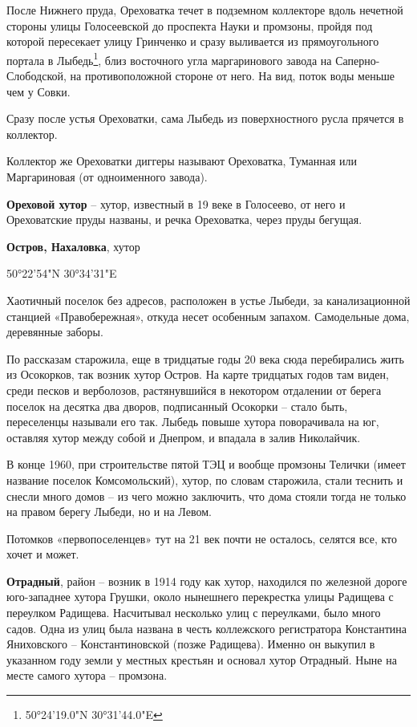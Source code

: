 После Нижнего пруда, Ореховатка течет в подземном коллекторе вдоль нечетной стороны улицы Голосеевской до проспекта Науки и промзоны, пройдя под которой пересекает улицу Гринченко и сразу выливается из прямоугольного портала в Лыбедь\footnote{50°24'19.0"N 30°31'44.0"E}, близ восточного угла маргаринового завода на Саперно-Слободской, на противоположной стороне от него. На вид, поток воды меньше чем у Совки.

Сразу после устья Ореховатки, сама Лыбедь из поверхностного русла прячется в коллектор.

Коллектор же Ореховатки диггеры называют Ореховатка, Туманная или Маргариновая (от одноименного завода).\\

\medskip

\textbf{Ореховой хутор} – хутор, известный в 19 веке в Голосеево, от него и Ореховатские пруды названы, и речка Ореховатка, через пруды бегущая.\\

\medskip

\textbf{Остров, Нахаловка}, хутор

50°22'54"N 30°34'31"E

Хаотичный поселок без адресов, расположен в устье Лыбеди, за канализационной станцией «Правобережная», откуда несет особенным запахом. Самодельные дома, деревянные заборы.

По рассказам старожила, еще в тридцатые годы 20 века сюда перебирались жить из Осокорков, так возник хутор Остров. На карте тридцатых годов там виден, среди песков и верболозов, растянувшийся в некотором отдалении от берега поселок на десятка два дворов, подписанный Осокорки – стало быть, переселенцы называли его так. Лыбедь повыше хутора поворачивала на юг, оставляя хутор между собой и Днепром, и впадала в залив Николайчик. 

В конце 1960, при строительстве пятой ТЭЦ и вообще промзоны Телички (имеет название поселок Комсомольский), хутор, по словам старожила, стали теснить и снесли много домов – из чего можно заключить, что дома стояли тогда не только на правом берегу Лыбеди, но и на Левом.

Потомков «первопоселенцев» тут на 21 век почти не осталось, селятся все, кто хочет и может.\\

\medskip


\textbf{Отрадный}, район – возник в 1914 году как хутор, находился по железной дороге юго-запад\-нее хутора Грушки, около нынешнего перекрестка улицы Радищева с переулком Радищева. Насчитывал несколько улиц с переулками, было много садов. Одна из улиц была названа в честь коллежского регистратора Константина Яниховского – Константиновской (позже Радищева). Именно он выкупил в указанном году земли у местных крестьян и основал хутор Отрадный. Ныне на месте самого хутора – промзона.\\


